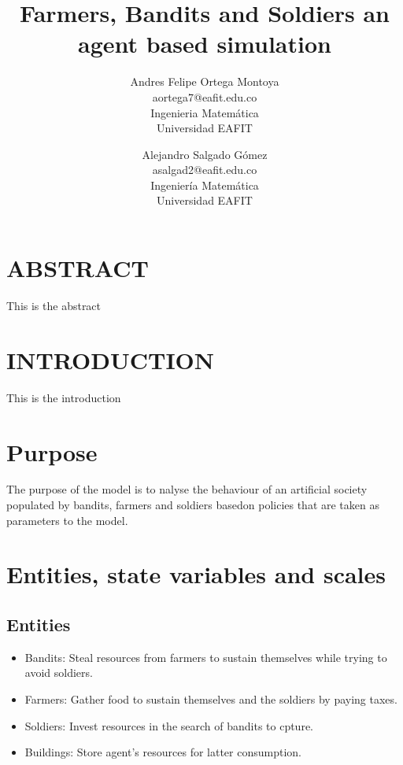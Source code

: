 \documentclass{wscpaperproc}
\theoremstyle{wsc}
\begin{document}

\title{Farmers, Bandits and Soldiers an agent based simulation}

\author{Andres Felipe Ortega Montoya\\ [12pt]
aortega7@eafit.edu.co\\
Ingenieria Matemática\\
Universidad EAFIT\\
\and
Alejandro Salgado Gómez\\[12pt]
asalgad2@eafit.edu.co\\
Ingeniería Matemática\\
Universidad EAFIT\\
}

\maketitle

\section*{ABSTRACT}
This is the abstract

\section{INTRODUCTION}

This is the introduction

\section{Purpose}

The purpose of the model is to nalyse the behaviour of an artificial society
populated by bandits, farmers and soldiers basedon policies that are taken as
parameters to the model.

\section{Entities, state variables and scales}

\subsection{Entities}

\begin{itemize}
    \item Bandits: Steal resources from farmers to sustain themselves while trying to avoid soldiers.
    \item Farmers: Gather food to sustain themselves and the soldiers by paying taxes.
    \item Soldiers: Invest resources in the search of bandits to cpture.
    \item Buildings: Store agent's resources for latter consumption.
\end{itemize}
\end{document}
